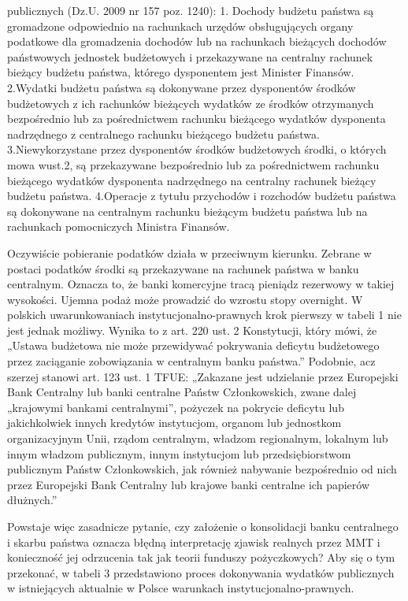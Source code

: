 \documentclass[
]{book}
\begin{document}
publicznych (Dz.U. 2009 nr 157 poz. 1240): 1. Dochody budżetu państwa są gromadzone odpowiednio na rachunkach urzędów obsługujących organy podatkowe dla gromadzenia dochodów lub na rachunkach bieżących dochodów państwowych jednostek budżetowych i przekazywane na centralny rachunek bieżący budżetu państwa, którego dysponentem jest Minister Finansów. 2.Wydatki budżetu państwa są dokonywane przez dysponentów środków budżetowych z ich rachunków bieżących wydatków ze środków otrzymanych bezpośrednio lub za pośrednictwem rachunku bieżącego wydatków dysponenta nadrzędnego z centralnego rachunku bieżącego budżetu państwa. 3.Niewykorzystane przez dysponentów środków budżetowych środki, o których mowa wust.2, są przekazywane bezpośrednio lub za pośrednictwem rachunku bieżącego wydatków dysponenta nadrzędnego na centralny rachunek bieżący budżetu państwa. 4.Operacje z tytułu przychodów i rozchodów budżetu państwa są dokonywane na centralnym rachunku bieżącym budżetu państwa lub na rachunkach pomocniczych Ministra Finansów.

Oczywiście pobieranie podatków działa w przeciwnym kierunku. Zebrane w postaci podatków środki są przekazywane na rachunek państwa w banku centralnym. Oznacza to, że banki komercyjne tracą pieniądz rezerwowy w takiej wysokości. Ujemna podaż może prowadzić do wzrostu stopy overnight. W polskich uwarunkowaniach instytucjonalno-prawnych krok pierwszy w tabeli 1 nie jest jednak możliwy. Wynika to z art. 220 ust. 2 Konstytucji, który mówi, że „Ustawa budżetowa nie może przewidywać pokrywania deficytu budżetowego przez zaciąganie zobowiązania w centralnym banku państwa.'' Podobnie, acz szerzej stanowi art. 123 ust. 1 TFUE: „Zakazane jest udzielanie przez Europejski Bank Centralny lub banki centralne Państw Członkowskich, zwane dalej „krajowymi bankami centralnymi'', pożyczek na pokrycie deficytu lub jakichkolwiek innych kredytów instytucjom, organom lub jednostkom organizacyjnym Unii, rządom centralnym, władzom regionalnym, lokalnym lub innym władzom publicznym, innym instytucjom lub przedsiębiorstwom publicznym Państw Członkowskich, jak również nabywanie bezpośrednio od nich przez Europejski Bank Centralny lub krajowe banki centralne ich papierów dłużnych.''

Powstaje więc zasadnicze pytanie, czy założenie o konsolidacji banku centralnego i skarbu państwa oznacza błędną interpretację zjawisk realnych przez MMT i konieczność jej odrzucenia tak jak teorii funduszy pożyczkowych? Aby się o tym przekonać, w tabeli 3 przedstawiono proces dokonywania wydatków publicznych w istniejących aktualnie w Polsce warunkach instytucjonalno-prawnych.
\end{document}
